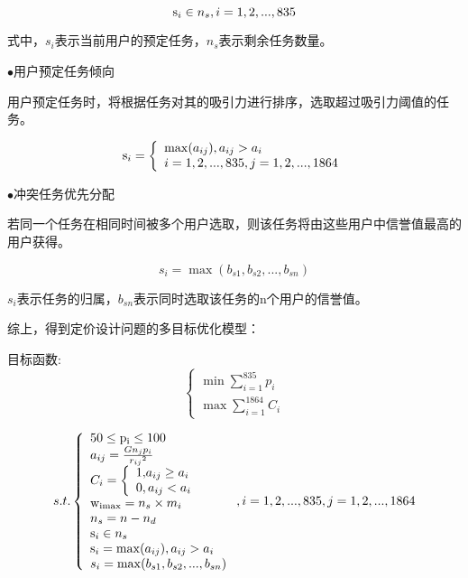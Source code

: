 \documentclass[withoutpreface,bwprint]{cumcmthesis} %
\begin{document}
\begin{equation}
{{\rm{s}}_i} \in {n_s},i = 1,2,...,835
\end{equation}

式中，${s_i}$表示当前用户的预定任务，${n_s}$表示剩余任务数量。

$\bullet$用户预定任务倾向

用户预定任务时，将根据任务对其的吸引力进行排序，选取超过吸引力阈值的任务。

\begin{equation}
{{\rm{s}}_i} = \left\{ \begin{array}{l}
\max ({a_{ij}}),{a_{ij}} > {a_i}\\
i = 1,2,...,835,j = 1,2,...,1864
\end{array} \right.
\end{equation}

$\bullet$冲突任务优先分配

若同一个任务在相同时间被多个用户选取，则该任务将由这些用户中信誉值最高的用户获得。

\begin{equation}
{s_i} = \max ({b_{s1}},{b_{s2}},...,{b_{sn}})
\end{equation}

${s_i}$表示任务的归属，${b_{sn}}$表示同时选取该任务的n个用户的信誉值。

综上，得到定价设计问题的多目标优化模型：

目标函数:
\begin{equation}
\left\{ \begin{array}{l}
\min \sum\limits_{i = 1}^{835} {{p_i}} \\
\max \sum\limits_{i = 1}^{1864} {{C_i}} 
\end{array} \right.
\end{equation}

\begin{equation}
s.t.\left\{ \begin{array}{l}
{\rm{50}} \le {\rm{p}}{}_{\rm{i}} \le 100\\
{a_{ij}} = \frac{{G{n_j}{p_i}}}{{{r_{ij}}^2}}\\
{C_i} = \left\{ \begin{array}{l}
{\rm{1,}}{a_{ij}} \ge {a_i}\\
0,{a_{ij}} < {a_i}
\end{array} \right.\\
{{\rm{w}}_{{\rm{imax}}}} = {n_s} \times {m_i}\\
{n_s} = n - {n_d}\\
{{\rm{s}}_i} \in {n_s}\\
{{\rm{s}}_i} = \max ({a_{ij}}),{a_{ij}} > {a_i}\\
{s_i} = \max ({b_{s1}},{b_{s2}},...,{b_{sn}})
\end{array} \right.,i = 1,2,...,835,j = 1,2,...,1864
\end{equation}
\end{document}
